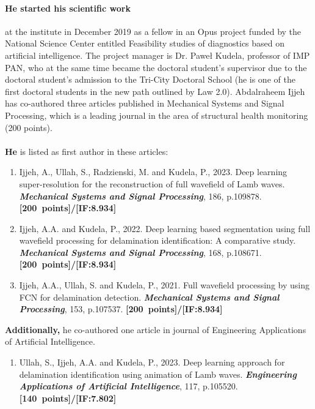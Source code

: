 \documentclass[12pt,a4paper]{article}
\begin{document}
	\paragraph{He started his scientific work} at the institute in December 2019 as a fellow in an Opus project funded by the National Science Center entitled Feasibility studies of diagnostics based on artificial intelligence. 
	The project manager is Dr. Paweł Kudela, professor of IMP PAN, who at the same time became the doctoral student's supervisor due to the doctoral student's admission to the Tri-City Doctoral School (he is one of the first doctoral students in the new path outlined by Law 2.0).
	Abdalraheem Ijjeh has co-authored three articles published in Mechanical Systems and Signal Processing, which is a leading journal in the area of structural health monitoring (200 points).
	\\ \\
	\textbf{He} is listed as first author in these articles:
	\addtolength{\leftmargini}{\labelsep}
	\begin{enumerate}
		\justifying
		\item Ijjeh, A., Ullah, S., Radzienski, M. and Kudela, P., 2023. Deep learning super-resolution for the reconstruction of full wavefield of Lamb waves. \textbf{\textit{Mechanical Systems and Signal Processing}}, 186, p.109878.						
		\textbf{[200~points]/[IF:8.934]}		
		\item Ijjeh, A.A. and Kudela, P., 2022. Deep learning based segmentation using full wavefield processing for delamination identification: A comparative study. \textbf{\textit{Mechanical Systems and Signal Processing}}, 168, p.108671. \textbf{[200~points]/[IF:8.934]}
		\item Ijjeh, A.A., Ullah, S. and Kudela, P., 2021. Full wavefield processing by using FCN for delamination detection. \textbf{\textit{Mechanical Systems and Signal Processing}}, 153, p.107537.		
		\textbf{[200~points]/[IF:8.934]}	
	\end{enumerate}		
	\textbf{Additionally,} he co-authored one article in journal of Engineering Applications of Artificial Intelligence. 
	\begin{enumerate}
		\item Ullah, S., Ijjeh, A.A. and Kudela, P., 2023. Deep learning approach for delamination identification using animation of Lamb waves. 						
		\textbf{\textit{Engineering Applications of Artificial Intelligence}}, 117, p.105520.		
		\textbf{[140~points]/[IF:7.802]}
	\end{enumerate}
		
\end{document}
